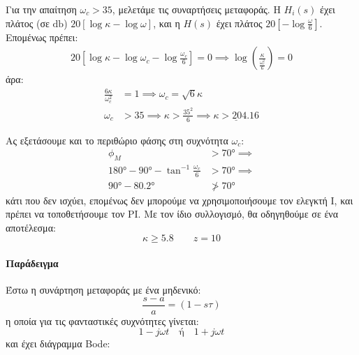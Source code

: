 \documentclass[11pt,a4paper,notitlepage,fleqn]{article}
\begin{document}
\begin{exercise}[Εφαρμογή]
Για την απαίτηση \( \omega_c > 35 \), μελετάμε τις συναρτήσεις μεταφοράς.
Η \( H_i(s) \) έχει πλάτος (σε \( \si{\decibel} \)) \( 20\left[\log κ - \log\omega\right] \),
και η \( H(s) \) έχει πλάτος \( 20\left[-\log\frac{\omega}{6}\right] \). Επομένως πρέπει:
\begin{align*}
	20\left[\log κ - \log \omega_c - \log\frac{\omega_c}{6}\right] = 0
	\implies \log\left( \frac{κ}{\frac{\omega_c^2}{6}} \right) = 0
\end{align*}
άρα:
\begin{align*}
	\frac{6κ}{\omega_c^2} &= 1 \implies \omega_c = \sqrt{6}κ \\
	\omega_c &>35 \implies κ > \frac{35^2}{6} \implies \underline{κ > 204.16}
\end{align*}

Ας εξετάσουμε και το περιθώριο φάσης στη συχνότητα \( \omega_c \):
\begin{align*}
	\phi_M &> \ang{70} \implies \\
	\ang{180} - \ang{90} - \tan^{-1}\frac{\omega_c}{6} &> \ang{70} \implies \\
	\ang{90} - \ang{80.2} &\ngtr \ang{70}
\end{align*}
κάτι που δεν ισχύει, επομένως δεν μπορούμε να χρησιμοποιήσουμε τον ελεγκτή I, και πρέπει
να τοποθετήσουμε τον PI. Με τον ίδιο συλλογισμό, θα οδηγηθούμε σε ένα αποτέλεσμα:
\[
κ \geq 5.8\qquad z=10
\]

\end{exercise}
\paragraph{Παράδειγμα}
Έστω η συνάρτηση μεταφοράς με ένα μηδενικό:
\[
\frac{s-a}{a} = (1-sτ)
\]
η οποία για τις φανταστικές συχνότητες γίνεται:
\[
1-j\omega t \quad \text{ή} \quad 1+j\omega t
\]
και έχει διάγραμμα Bode:
\end{document}
